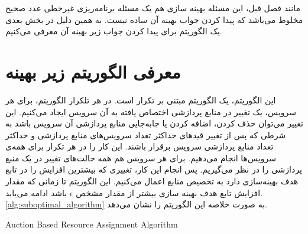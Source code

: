     مانند فصل قبل، این مسئله بهینه سازی هم یک مسئله برنامه‌ریزی غیرخطی عدد صحیح مخلوط می‌باشد که پیدا کردن جواب بهینه آن ساده نیست.
    به همین دلیل در بخش بعدی یک الگوریتم برای پیدا کردن جواب زیر بهینه آن معرفی می‌کنیم.

  \section{معرفی الگوریتم زیر بهینه}
    این الگوریتم، یک الگوریتم مبتنی بر تکرار است.
    در هر تلکرار الگوریتم، برای هر سرویس، یک تغییر در منابع پردازشی اختصاص یافته به آن سرویس ایجاد می‌کنیم.
    این تغییر می‌توان حذف کردن، اضافه کردن یا جابه‌جایی منابع پردازشی آن سرویس باشد به شرطی که پس از تغییر قید‌های حداکثر تعداد سرویس‌های منابع پردازشی و حداکثر تعداد منابع پردازشی سرویس برقرار باشند.
    این کار را در هر تکرار برای همه‌ی سرویس‌ها انجام می‌دهیم.
    برای هر سرویس هم همه حالت‌های تغییر در یک منبع پردازشی را در نظر می‌گیریم.
    پس انجام این کار، تغییری که بیشترین افزایش را در تابع هدف بهینه‌سازی دارد به تخصیص منابع اعمال می‌کنیم.
    این الگوریتم تا زمانی که مقدار افزایش تابع هدف بهینه سازی بیشتر از مقدار مشخص $\epsilon$ باشد ادامه می‌یابد.
    \cref{alg:suboptimal_algorithm} به صورت خلاصه این الگوریتم را نشان می‌دهد.

    \begin{latin}
      \begin{algorithm}[t]
        \caption{Auction ‌Based Resource Assignment Algorithm}
        \label{alg:suboptimal_algorithm}
        \begin{algorithmic}[1]
          \While{$\nu > \epsilon$}
                    \EndIf
                  \EndIf
                \EndIf
              \EndFor
            \EndFor
          \EndWhile
        \end{algorithmic}
      \end{algorithm}
    \end{latin}

